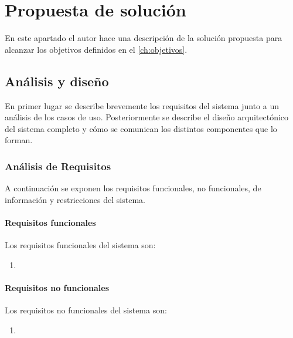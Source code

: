 \documentclass[../main.tex]{subfiles}
\begin{document}
\chapter{Propuesta de solución}\label{ch:propuesta_solucion}
En este apartado el autor hace una descripción de la solución propuesta para alcanzar los objetivos definidos en el \autoref{ch:objetivos}.

\section{Análisis y diseño}\label{sec:analisis_diseno}
En primer lugar se describe brevemente los requisitos del sistema junto a un análisis de los casos de uso. Posteriormente se describe el diseño arquitectónico del sistema completo y cómo se comunican los distintos componentes que lo forman.

\subsection{Análisis de Requisitos}\label{subsec:analisis_requisitos}
A continuación se exponen los requisitos funcionales, no funcionales, de información y restricciones del sistema.

\subsubsection{Requisitos funcionales}\label{subsubsec:req_funcionales}
Los requisitos funcionales del sistema son:
\begin{enumerate}
    \item 
\end{enumerate}

\subsubsection{Requisitos no funcionales}\label{subsubsec:req_nofuncionales}
Los requisitos no funcionales del sistema son:
\begin{enumerate}
    \item 
\end{enumerate}
\end{document}
